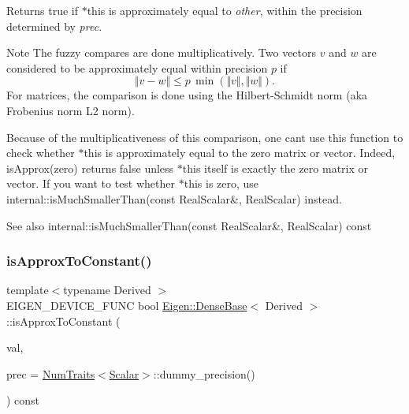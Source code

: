 \begin{DoxyReturn}{Returns}
{\ttfamily true} if {\ttfamily $\ast$this} is approximately equal to {\itshape other}, within the precision determined by {\itshape prec}.
\end{DoxyReturn}
\begin{DoxyNote}{Note}
The fuzzy compares are done multiplicatively. Two vectors $ v $ and $ w $ are considered to be approximately equal within precision $ p $ if \[ \Vert v - w \Vert \leqslant p\,\min(\Vert v\Vert, \Vert w\Vert). \] For matrices, the comparison is done using the Hilbert-\/\+Schmidt norm (aka Frobenius norm L2 norm).

Because of the multiplicativeness of this comparison, one can\textquotesingle{}t use this function to check whether {\ttfamily $\ast$this} is approximately equal to the zero matrix or vector. Indeed, {\ttfamily is\+Approx(zero)} returns false unless {\ttfamily $\ast$this} itself is exactly the zero matrix or vector. If you want to test whether {\ttfamily $\ast$this} is zero, use internal\+::is\+Much\+Smaller\+Than(const Real\+Scalar\&, Real\+Scalar) instead.
\end{DoxyNote}
\begin{DoxySeeAlso}{See also}
internal\+::is\+Much\+Smaller\+Than(const Real\+Scalar\&, Real\+Scalar) const 
\end{DoxySeeAlso}
\mbox{\label{class_eigen_1_1_dense_base_aafb86c9868d3d9076e01e4fc54c93e81}} 
\subsubsection{\texorpdfstring{isApproxToConstant()}{isApproxToConstant()}}
{\footnotesize\ttfamily template$<$typename Derived $>$ \\
E\+I\+G\+E\+N\+\_\+\+D\+E\+V\+I\+C\+E\+\_\+\+F\+U\+NC bool \mbox{\hyperlink{class_eigen_1_1_dense_base}{Eigen\+::\+Dense\+Base}}$<$ Derived $>$\+::is\+Approx\+To\+Constant (\begin{DoxyParamCaption}\item[{const \mbox{\hyperlink{class_eigen_1_1_dense_base_a5feed465b3a8e60c47e73ecce83e39a2}{Scalar}} \&}]{val,  }\item[{const Real\+Scalar \&}]{prec = {\ttfamily \mbox{\hyperlink{struct_eigen_1_1_num_traits}{Num\+Traits}}$<$\mbox{\hyperlink{class_eigen_1_1_dense_base_a5feed465b3a8e60c47e73ecce83e39a2}{Scalar}}$>$\+:\+:dummy\+\_\+precision()} }\end{DoxyParamCaption}) const}

